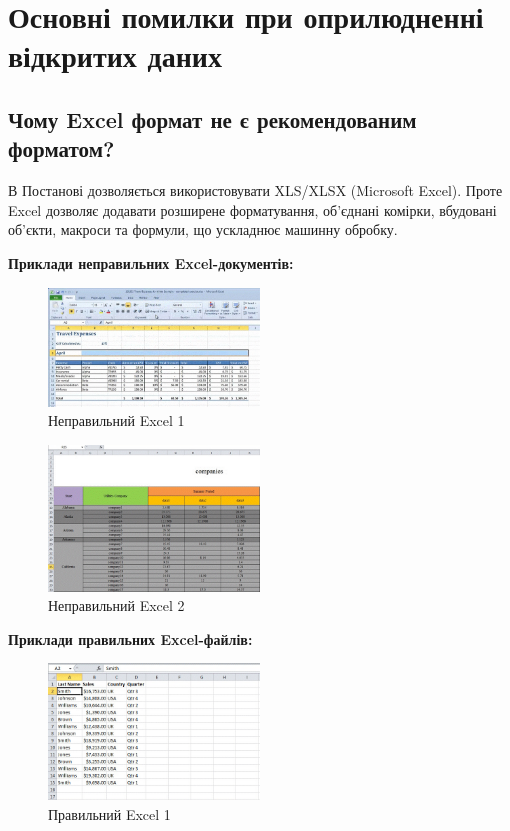 \section{Основні помилки при оприлюдненні відкритих даних}

\subsection{Чому Excel формат не є рекомендованим форматом?}

В Постанові дозволяється використовувати XLS/XLSX (Microsoft Excel). Проте Excel дозволяє додавати розширене форматування, об’єднані комірки, вбудовані об’єкти, макроси та формули, що ускладнює машинну обробку.

\textbf{Приклади неправильних Excel-документів:}

\begin{figure}[h]
    \centering
    \includegraphics[width=0.5\textwidth]{images/004.jpg}
    \caption{Неправильний Excel 1}
\end{figure}

\begin{figure}[h]
    \centering
    \includegraphics[width=0.5\textwidth]{images/005.jpg}
    \caption{Неправильний Excel 2}
\end{figure}

\textbf{Приклади правильних Excel-файлів:}

\begin{figure}[h]
    \centering
    \includegraphics[width=0.5\textwidth]{images/006.jpg}
    \caption{Правильний Excel 1}
\end{figure}

